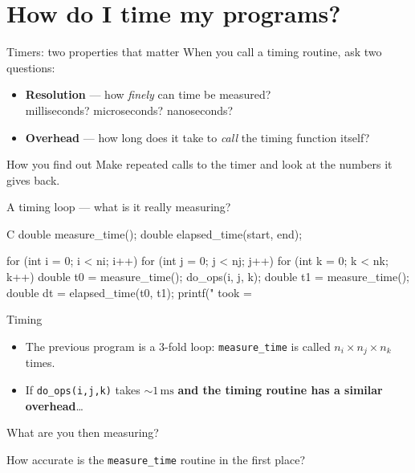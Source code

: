 \documentclass[aspectratio=169]{beamer}
\newcommand{\cplx}[1]{{\footnotesize\color{cookieMuted}#1}}
\begin{document}
\section{How do I time my programs?}

\begin{frame}{Timers: two properties that matter}
  When you call a timing routine, ask two questions:
  \begin{itemize}\setlength\itemsep{6pt}
    \item \textbf{Resolution} --- how \emph{finely} can time be measured?
      \\ \cplx{milliseconds? microseconds? nanoseconds?}
    \item \textbf{Overhead} --- how long does it take to \emph{call} the timing
      function itself?
  \end{itemize}
  \bigskip
  \begin{block}{How you find out}
    Make repeated calls to the timer and look at the numbers it gives back.
  \end{block}
\end{frame}

\begin{frame}[fragile]{A timing loop --- what is it really measuring?}
  \begin{cookiecode}[title={the classic pattern}]{C}
double measure_time();
double elapsed_time(start, end);

for (int i = 0; i < ni; i++) {
  for (int j = 0; j < nj; j++) {
    for (int k = 0; k < nk; k++) {
      double t0 = measure_time();
      {
        do_ops(i, j, k);
      }
      double t1 = measure_time();
      double dt = elapsed_time(t0, t1);
      printf(" took = %
    }
  }
}
  \end{cookiecode}
\end{frame}

\begin{frame}{Timing}
  \begin{itemize}\setlength\itemsep{6pt}
    \item The previous program is a 3-fold loop: \texttt{measure\_time} is called
      $n_i \times n_j \times n_k$ times.
    \item If \texttt{do\_ops(i,j,k)} takes ${\sim}1\,\text{ms}$ \textbf{and the
      timing routine has a similar overhead}\ldots
  \end{itemize}
  \bigskip
  \begin{cookiequote}
    What are you then measuring?
  \end{cookiequote}
  \bigskip
  \cplx{How accurate is the \texttt{measure\_time} routine in the first place?}
\end{frame}
\end{document}
